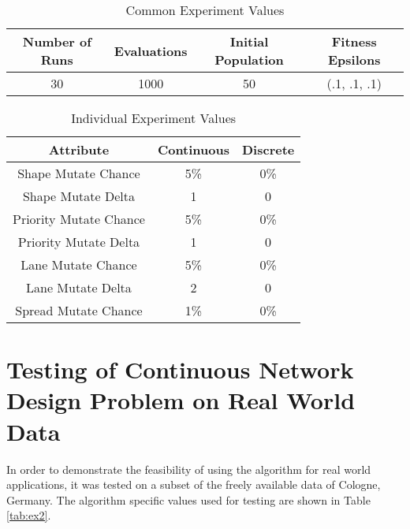 \documentclass[11pt, oneside, notitlepage, final]{article}
\begin{document}
        \begin{table}[H]
        \label{tab:ex1a}
        \centering
        \begin{tabular}{ | c | c | c | c |}
            \hline
            Number of Runs  & Evaluations   & Initial Population    & Fitness Epsilons  \\ \hline
            30              & 1000          & 50                    & (.1, .1, .1)          \\ \hline
        \end{tabular}
        \caption{Common Experiment Values}
        \end{table}

        \begin{table}[H]
        \label{tab:ex1b}
        \centering
        \begin{tabular}{ | c | c | c |}
            \hline
            Attribute           &       Continuous  &   Discrete    \\ \hline
            Shape Mutate Chance &       5\%         &   0\%         \\ \hline
            Shape Mutate Delta  &       1           &   0           \\ \hline
            Priority Mutate Chance &    5\%         &   0\%         \\ \hline
            Priority Mutate Delta &     1           &   0           \\ \hline
            Lane Mutate Chance    &     5\%         &   0\%         \\ \hline
            Lane Mutate Delta     &     2 &             0           \\ \hline
            Spread Mutate Chance  &     1\%         &   0\%         \\ \hline
        \end{tabular}
        \caption{Individual Experiment Values}
        \end{table}


    \section{Testing of Continuous Network Design Problem on Real World Data}
        In order to demonstrate the feasibility of using the algorithm for real world applications, it was tested on a subset of the freely available data of Cologne, Germany. The algorithm specific values used for testing are shown in Table \ref{tab:ex2}.
\end{document}
